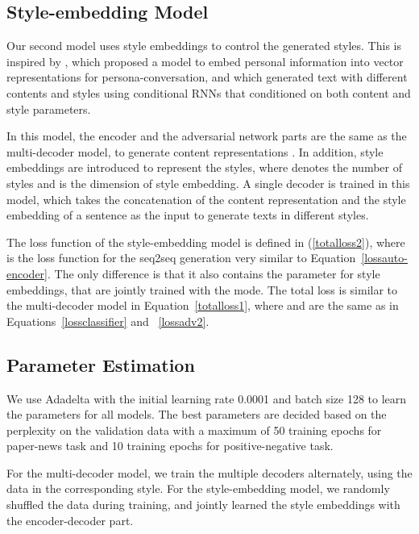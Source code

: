 \documentclass[letterpaper]{article} \usepackage{aaai18}  \usepackage{times}  \usepackage{helvet}  \usepackage{courier}  \usepackage{url}  \usepackage{graphicx}  \usepackage{amsmath}
\begin{document}
\subsection{Style-embedding Model} 
Our second model uses style embeddings to control the generated styles. 
This is inspired by \cite{li2016persona}, which proposed a model to embed 
personal information into vector representations for persona-conversation,
and \cite{ficler2017controlling} which generated text with different contents and styles 
using conditional RNNs that conditioned on both content and style parameters. 


In this model, the encoder and the adversarial network parts are the same as the  
multi-decoder model, to generate content representations .
In addition, style embeddings  are introduced to represent the styles, 
where  denotes the number of styles and  is the dimension of style embedding.
A single decoder is trained in this model, which takes the concatenation of the content representation 
 and the style embedding  of a sentence as the input to generate texts in different styles. 


The loss function of the style-embedding model is defined in (\ref{totalloss2}), 
where  is the loss function for the seq2seq generation very similar to Equation~\ref{lossauto-encoder}. 
The only difference is that it also contains the parameter  for style embeddings, that are 
jointly trained with the mode.
The total loss is similar to the multi-decoder model in Equation~\ref{totalloss1},  
where  and  are the same as in Equations~\ref{lossclassifier} and ~\ref{lossadv2}. 
{\small

}



\subsection{Parameter Estimation}
We use Adadelta \cite{zeiler2012adadelta} with the initial learning rate 0.0001 and batch size 128 to learn the parameters for all models. 
The best parameters are decided based on the perplexity on the validation data with a maximum of 50 training epochs for paper-news task and 10 training epochs for positive-negative task. 

For the multi-decoder model, we train the multiple decoders alternately, using the data 
in the corresponding style. For the style-embedding model, we randomly shuffled the data during training, 
and jointly learned the style embeddings with the encoder-decoder part.
\end{document}
